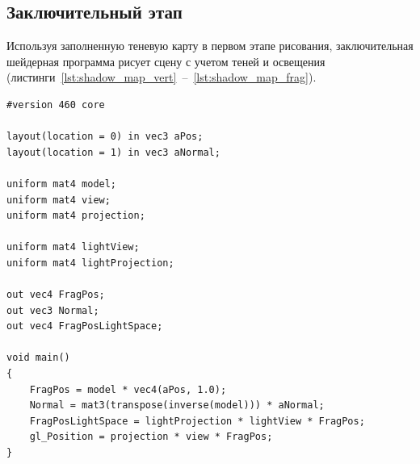 \subsection*{Заключительный этап}

Используя заполненную теневую карту в первом этапе рисования,
заключительная шейдерная программа рисует сцену с учетом теней и освещения
(листинги~\ref{lst:shadow_map_vert}~--~\ref{lst:shadow_map_frag}).

\begin{center}
\captionsetup{justification=centering, singlelinecheck=off}
\begin{lstlisting}[label=lst:shadow_map_vert, caption=Вершинный шейдер преобразования координат]
#version 460 core

layout(location = 0) in vec3 aPos;
layout(location = 1) in vec3 aNormal;

uniform mat4 model;
uniform mat4 view;
uniform mat4 projection;

uniform mat4 lightView;
uniform mat4 lightProjection;

out vec4 FragPos;
out vec3 Normal;
out vec4 FragPosLightSpace;

void main()
{
    FragPos = model * vec4(aPos, 1.0);
    Normal = mat3(transpose(inverse(model))) * aNormal;
    FragPosLightSpace = lightProjection * lightView * FragPos;
    gl_Position = projection * view * FragPos;
}
\end{lstlisting}
\end{center}


